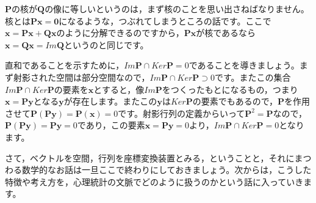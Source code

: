 \documentclass{ltjsbook}
\begin{document}
$\bm{P}$の核が$\bm{Q}$の像に等しいというのは，まず核のことを思い出さねばなりません。核とは$\bm{Px}=\bm{0}$になるような，つぶれてしまうところの話です。ここで$\bm{x} = \bm{Px} + \bm{Qx}$のように分解できるのですから，$\bm{Px}$が核であるなら$\bm{x} = \bm{Qx} = Im \bm{Q}$というのと同じです。

直和であることを示すために，$Im \bm{P}\cap Ker\bm{P} ={0}$であることを導きましょう。まず射影された空間は部分空間なので，$Im \bm{P} \cap Ker\bm{P} \supset	{0}$です。またこの集合$Im \bm{P}\cap Ker\bm{P}$の要素を$\bm{x}$とすると，像$Im \bm{P}$をつくったもとになるもの，つまり$\bm{x}=\bm{Py}$となる$\bm{y}$が存在します。またこの$\bm{y}$は$Ker \bm{P}$の要素でもあるので，$\bm{P}$を作用させて$\bm{P}(\bm{Py}) = \bm{P}(\bm{x}) = 0$です。射影行列の定義からいって$\bm{P}^2 = \bm{P}$なので，$\bm{P}(\bm{Py})=\bm{Py} = 0$であり，この要素$\bm{x}=\bm{Py}=0$より，$Im \bm{P}\cap Ker\bm{P} ={0}$となります。

\vspace{2cm}
さて，ベクトルを空間，行列を座標変換装置とみる，ということと，それにまつわる数学的なお話は一旦ここで終わりにしておきましょう。次からは，こうした特徴や考え方を，心理統計の文脈でどのように扱うのかという話に入っていきます。
\end{document}
